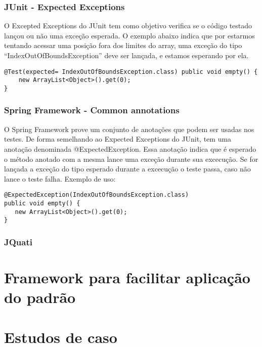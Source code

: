 \documentclass[12pt,a4paper,oneside]{book}
\begin{document}
\subsection{JUnit - Expected Exceptions}
O Excepted Exceptions do JUnit tem como objetivo verifica se o código testado lançou ou não uma exceção esperada.
O exemplo abaixo indica que por estarmos tentando acessar uma posição fora dos limites do array, uma exceção do tipo ``IndexOutOfBoundsException'' deve ser lançada, e estamos esperando por ela.
\begin{verbatim}
@Test(expected= IndexOutOfBoundsException.class) public void empty() { 
    new ArrayList<Object>().get(0); 
}
\end{verbatim}

\subsection{Spring Framework - Common annotations}
O Spring Framework prove um conjunto de anotações que podem ser usadas nos testes. De forma semelhando ao Expected Exceptions do JUnit, tem uma anotação denominada @ExpectedException. 
Essa anotação indica que é esperado o método anotado com a mesma lance uma exceção durante sua excecução. Se for lançada a exceção do tipo esperado durante a excecução o teste passa, caso não lance o teste falha.
Exemplo de uso:
\begin{verbatim}
@ExpectedException(IndexOutOfBoundsException.class)
public void empty() {
   new ArrayList<Object>().get(0);
}
\end{verbatim}

\subsection{JQuati}




\chapter{Framework para facilitar aplicação do padrão}

\chapter{Estudos de caso}
\end{document}

